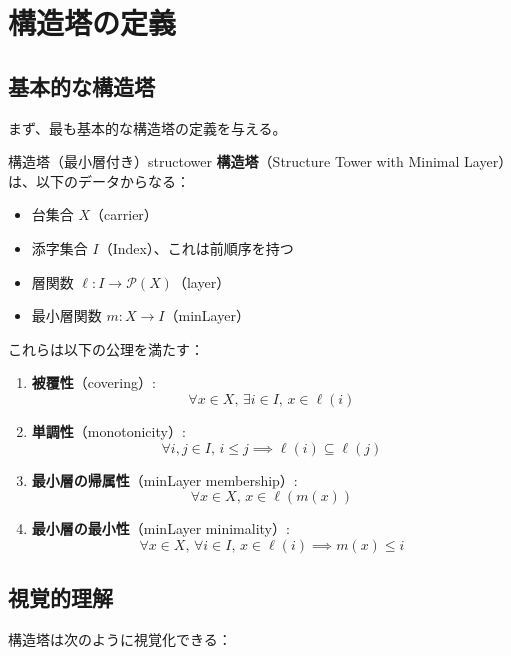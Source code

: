 \documentclass[a4paper,12pt]{ltjsarticle}
\begin{document}
\section{構造塔の定義}

\subsection{基本的な構造塔}

まず、最も基本的な構造塔の定義を与える。

\begin{definition}{構造塔（最小層付き）}{structower}
\textbf{構造塔}（Structure Tower with Minimal Layer）は、以下のデータからなる：

\begin{itemize}
    \item 台集合 $X$（carrier）
    \item 添字集合 $I$（Index）、これは前順序を持つ
    \item 層関数 $\ell : I \to \mathcal{P}(X)$（layer）
    \item 最小層関数 $m : X \to I$（minLayer）
\end{itemize}

これらは以下の公理を満たす：

\begin{enumerate}
    \item \textbf{被覆性}（covering）:
    \[\forall x \in X,\, \exists i \in I,\, x \in \ell(i)\]

    \item \textbf{単調性}（monotonicity）:
    \[\forall i, j \in I,\, i \leq j \implies \ell(i) \subseteq \ell(j)\]

    \item \textbf{最小層の帰属性}（minLayer membership）:
    \[\forall x \in X,\, x \in \ell(m(x))\]

    \item \textbf{最小層の最小性}（minLayer minimality）:
    \[\forall x \in X,\, \forall i \in I,\, x \in \ell(i) \implies m(x) \leq i\]
\end{enumerate}
\end{definition}

\subsection{視覚的理解}

構造塔は次のように視覚化できる：
\end{document}

